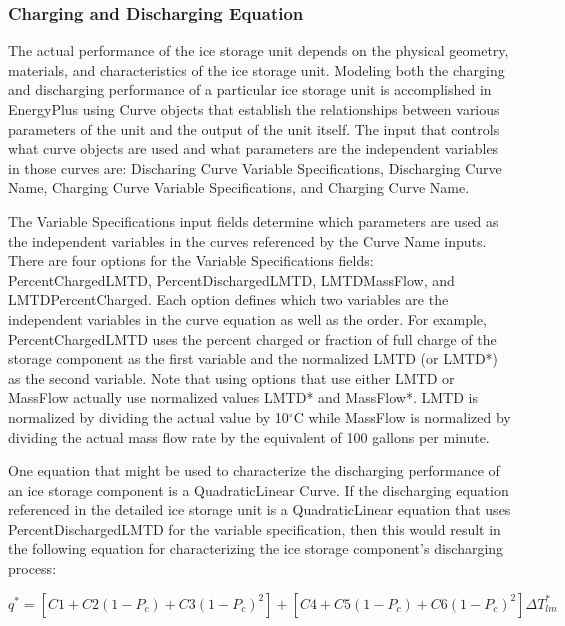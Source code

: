 \subsubsection{Charging and Discharging Equation}\label{charging-and-discharging-equation}

The actual performance of the ice storage unit depends on the physical geometry, materials, and characteristics of the ice storage unit. Modeling both the charging and discharging performance of a particular ice storage unit is accomplished in EnergyPlus using Curve objects that establish the relationships between various parameters of the unit and the output of the unit itself. The input that controls what curve objects are used and what parameters are the independent variables in those curves are: Discharing Curve Variable Specifications, Discharging Curve Name, Charging Curve Variable Specifications, and Charging Curve Name.

The Variable Specifications input fields determine which parameters are used as the independent variables in the curves referenced by the Curve Name inputs.  There are four options for the Variable Specifications fields: PercentChargedLMTD, PercentDischargedLMTD, LMTDMassFlow, and LMTDPercentCharged.  Each option defines which two variables are the independent variables in the curve equation as well as the order.  For example, PercentChargedLMTD uses the percent charged or fraction of full charge of the storage component as the first variable and the normalized LMTD (or LMTD*) as the second variable.  Note that using options that use either LMTD or MassFlow actually use normalized values LMTD* and MassFlow*.  LMTD is normalized by dividing the actual value by 10\(^{\circ}\)C while MassFlow is normalized by dividing the actual mass flow rate by the equivalent of 100 gallons per minute.  

One equation that might be used to characterize the discharging performance of an ice storage component is a QuadraticLinear Curve.  If the discharging equation referenced in the detailed ice storage unit is a QuadraticLinear equation that uses PercentDischargedLMTD for the variable specification, then this would result in the following equation for characterizing the ice storage component's discharging process:

\begin{equation}
{q^*} = \left[ {C1 + C2\left( {1 - {P_c}} \right) + C3{{\left( {1 - {P_c}} \right)}^2}} \right] + \left[ {C4 + C5\left( {1 - {P_c}} \right) + C6{{\left( {1 - {P_c}} \right)}^2}} \right]\Delta T_{lm}^*
\end{equation}

